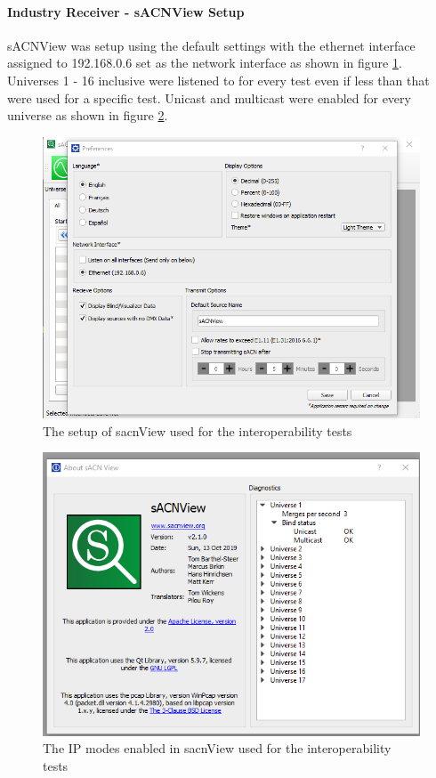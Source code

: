 \documentclass[11pt,a4paper]{article}
\begin{document}
\paragraph*{Industry Receiver - sACNView Setup}
sACNView was setup using the default settings with the ethernet interface assigned to 192.168.0.6 set as the network interface as shown in figure \ref{SACN_VIEW_INTEROP_SETUP}. Universes 1 - 16 inclusive were listened to for every test even if less than that were used for a specific test. Unicast and multicast were enabled for every universe as shown in figure \ref{SACN_VIEW_UNICAST_MULTICAST_ENABLED}.

\begin{figure}[H]
	\label{SACN_VIEW_INTEROP_SETUP}
	\includegraphics*[width=\textwidth]{sacnViewSettings.png}
	\caption{The setup of sacnView used for the interoperability tests}
\end{figure}

\begin{figure}[H]
	\label{SACN_VIEW_UNICAST_MULTICAST_ENABLED}
	\includegraphics*[width=\textwidth]{sacnViewIPmodes.png}
	\caption{The IP modes enabled in sacnView used for the interoperability tests}
\end{figure}
\end{document}
